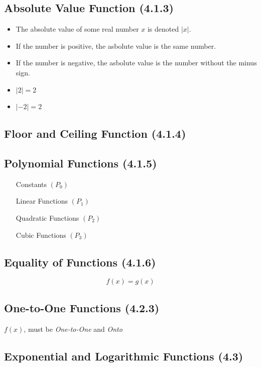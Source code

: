 \documentclass[]{report}
\begin{document}
\subsection*{Absolute Value Function (4.1.3)}


\begin{itemize}
\item The absolute value of some real number $x$ is denoted $|x|$.
\item If the number is positive, the asbolute value is the same number.
\item If the number is negative, the asbolute value is the number without the minus sign.
\item $|2|=2$
\item $|-2| = 2$
\end{itemize}
\subsection*{Floor and Ceiling Function (4.1.4)}
\subsection*{Polynomial Functions (4.1.5)}

\begin{itemize}
\item[Constants] $(P_0)$
\item[Linear Functions] $(P_1)$
\item[Quadratic Functions] $(P_2)$
\item[Cubic Functions] $(P_3)$
\end{itemize}


\subsection*{Equality of Functions (4.1.6)}
\[f(x) = g(x) \]



\subsection*{One-to-One Functions (4.2.3)}
$f(x)$, must be \emph{One-to-One} and \emph{Onto}



\subsection*{Exponential and Logarithmic Functions (4.3)}
\end{document}
